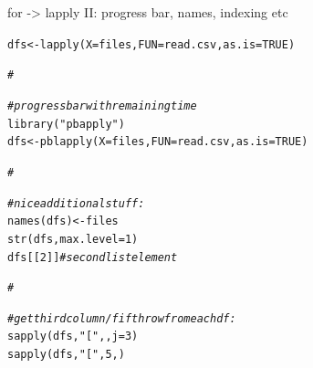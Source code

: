 \documentclass[xcolor=table,       handout,    xcolor=dvipsnames]{beamer}\usepackage[]{graphicx}\usepackage[]{color}
\makeatletter
\newcommand{\hlnum}[1]{\textcolor[rgb]{0,0,0}{#1}}
\newcommand{\hlstr}[1]{\textcolor[rgb]{0.545,0.137,0.137}{#1}}
\newcommand{\hlcom}[1]{\textcolor[rgb]{0,0.392,0}{\textit{#1}}}
\newcommand{\hlstd}[1]{\textcolor[rgb]{0,0,0}{#1}}
\newcommand{\hlkwb}[1]{\textcolor[rgb]{0,0,0}{#1}}
\newcommand{\hlkwc}[1]{\textcolor[rgb]{1,0,1}{#1}}
\newcommand{\hlkwd}[1]{\textcolor[rgb]{0,0,1}{#1}}
\newenvironment{kframe}{%
 \def\at@end@of@kframe{}%
 \ifinner\ifhmode%
  \def\at@end@of@kframe{\end{minipage}}%
  \begin{minipage}{\columnwidth}%
 \fi\fi%
 \def\FrameCommand##1{\hskip\@totalleftmargin \hskip-\fboxsep
 \colorbox{shadecolor}{##1}\hskip-\fboxsep
     \hskip-\linewidth \hskip-\@totalleftmargin \hskip\columnwidth}%
 \MakeFramed {\advance\hsize-\width
   \@totalleftmargin\z@ \linewidth\hsize
   \@setminipage}}%
 {\par\unskip\endMakeFramed%
 \at@end@of@kframe}
\newenvironment{knitrout}{}{} %
\makeatother
\begin{document}
\begin{frame}[fragile]{for -> lapply II: progress bar, names, indexing etc}
\vspace{-0.6em}
\begin{knitrout}
\color{fgcolor}\begin{kframe}
\begin{alltt}
\hlstd{dfs} \hlkwb{<-}   \hlkwd{lapply}\hlstd{(}\hlkwc{X}\hlstd{=files,} \hlkwc{FUN}\hlstd{=read.csv,} \hlkwc{as.is}\hlstd{=}\hlnum{TRUE}\hlstd{)}

\hlcom{#}
\end{alltt}
\end{kframe}
\end{knitrout}
\pause \vspace{-3.48em}
\begin{knitrout}
\color{fgcolor}\begin{kframe}
\begin{alltt}
\hlcom{# progress bar with remaining time}
\hlkwd{library}\hlstd{(}\hlstr{"pbapply"}\hlstd{)}
\hlstd{dfs} \hlkwb{<-} \hlkwd{pblapply}\hlstd{(}\hlkwc{X}\hlstd{=files,} \hlkwc{FUN}\hlstd{=read.csv,} \hlkwc{as.is}\hlstd{=}\hlnum{TRUE}\hlstd{)}

\hlcom{#}
\end{alltt}
\end{kframe}
\end{knitrout}
\pause \vspace{-3.48em}
\begin{knitrout}
\color{fgcolor}\begin{kframe}
\begin{alltt}
\hlcom{# nice additional stuff:}
\hlkwd{names}\hlstd{(dfs)} \hlkwb{<-} \hlstd{files}
\hlkwd{str}\hlstd{(dfs,} \hlkwc{max.level}\hlstd{=}\hlnum{1}\hlstd{)}
\hlstd{dfs[[}\hlnum{2}\hlstd{]]} \hlcom{# second list element}

\hlcom{#}
\end{alltt}
\end{kframe}
\end{knitrout}
\pause \vspace{-3.58em}
\begin{knitrout}
\color{fgcolor}\begin{kframe}
\begin{alltt}
\hlcom{# get third column / fifth row from each df:}
\hlkwd{sapply}\hlstd{(dfs,} \hlstr{"["}\hlstd{,  ,} \hlkwc{j}\hlstd{=}\hlnum{3}\hlstd{)}
\hlkwd{sapply}\hlstd{(dfs,} \hlstr{"["}\hlstd{,} \hlnum{5}\hlstd{,    )}
\end{alltt}
\end{kframe}
\end{knitrout}
\end{frame}
\end{document}

